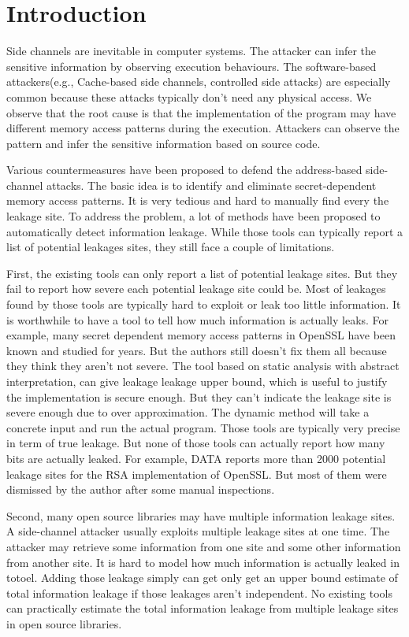 \section{Introduction}

Side channels are inevitable in computer systems. The attacker can infer the sensitive information by observing execution behaviours. The software-based attackers(e.g., Cache-based side channels, controlled side attacks) are especially common because these attacks typically don’t need any physical access. We observe that the root cause is that the implementation of the program may have different memory access patterns during the execution. Attackers can observe the pattern and infer the sensitive information based on source code.

Various countermeasures have been proposed to defend the address-based side-channel attacks. The basic idea is to identify and eliminate secret-dependent memory access patterns. It is very tedious and hard to manually find every the leakage site. To address the problem, a lot of methods have been proposed to automatically detect information leakage. While those tools can typically report a list of potential leakages sites, they still face a couple of limitations.

First, the existing tools can only report a list of potential leakage sites. But they fail to report how severe each potential leakage site could be. Most of leakages found by those tools are typically hard to exploit or leak too little information.  It is worthwhile to have a tool to tell how much information is actually leaks. For example, many secret dependent memory access patterns in OpenSSL have been known and studied for years. But the authors still doesn’t fix them all because they think they aren’t not severe. The tool based on static analysis with abstract interpretation, can give leakage leakage upper bound, which is useful to justify the implementation is secure enough. But they can’t indicate the leakage site is severe enough due to over approximation. The dynamic method will take a concrete input and run the actual program. Those tools are typically very precise in term of true leakage. But none of those tools can actually report how many bits are actually leaked. For example, DATA reports more than 2000 potential leakage sites for the RSA implementation of OpenSSL. But most of them were dismissed by the author after some manual inspections.

Second, many open source libraries may have multiple information leakage sites. A side-channel attacker usually exploits multiple leakage sites at one time. The attacker may retrieve some information from one site and some other information from another site. It is hard to model how much information is actually leaked in totoel. Adding those leakage simply can get only get an upper bound estimate of total information leakage if those leakages aren’t independent. No existing tools can practically estimate the total information leakage from multiple leakage sites in open source libraries.

